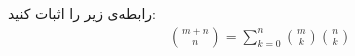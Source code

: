 \p
رابطه‌ی زیر را اثبات کنید:
        \begin{align*}
       \binom{m + n}{n} = \sum\limits_{k=0}^{n} \binom{m}{k} \binom{n}{k}
        \end{align*}